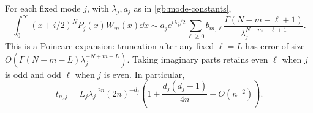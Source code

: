 \begin{proposition}\label{gb:all-orders}
For each fixed mode $j$, with $\lambda_j,a_j$ as in
\eqref{gb:mode-constants},
\begin{equation}\label{gb:all-orders-moments}
 \int_0^\infty(x+i/2)^NP_j(x)W_m(x)\dd x
 \sim a_je^{i\lambda_j/2}
       \sum_{\ell\ge0}b_{m,\ell}
       \frac{\Gamma(N-m-\ell+1)}{
                            \lambda_j^{N-m-\ell+1}}.
\end{equation}
This is a Poincare expansion: truncation after any fixed $\ell=L$
has error of size
$O(\Gamma(N-m-L)\lambda_j^{-N+m+L})$.
Taking imaginary parts retains even $\ell$ when $j$ is odd and
odd $\ell$ when $j$ is even.  In particular,
\begin{equation}\label{gb:t-first-correction}
 t_{n,j}=L_j\lambda_j^{-2n}(2n)^{-d_j}
       \left(1+\frac{d_j(d_j-1)}{4n}+O(n^{-2})\right).
\end{equation}
\end{proposition}

